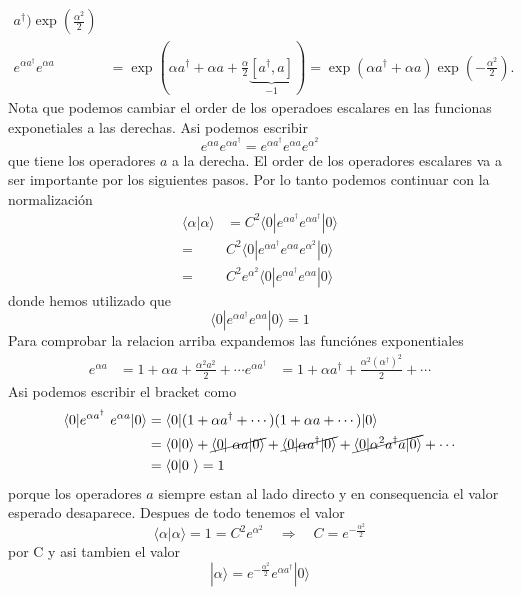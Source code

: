 \begin{solucion}
\begin{align*}
a^\dagger) \exp(\frac{\alpha^2}{2}) \\
	e^{\alpha a^\dagger} e^{\alpha a} &= \exp(\alpha a^\dagger + \alpha a +
\frac{\alpha}{2} \underbrace{[a^\dagger, a]}_{-1}) = \exp(\alpha a^\dagger +
\alpha a) \exp(-\frac{\alpha^2}{2}).
\end{align*}
Nota que podemos cambiar el order de los operadoes escalares en las funcionas
exponetiales a las derechas. Asi podemos escribir
$$
	e^{\alpha a} e^{\alpha a^\dagger} = e^{\alpha a^\dagger} e^{\alpha a}
e^{\alpha^2}
$$
que tiene los operadores $a$ a la derecha. El order de los operadores escalares
va a ser importante por los siguientes pasos. Por lo tanto podemos continuar con
la normalización
\begin{align*}
	\langle \alpha | \alpha \rangle &= C^2 \langle 0 | e^{\alpha a^\dagger}
e^{\alpha a^\dagger} | 0\rangle \\
	=& C^2 \langle 0 | e^{\alpha a^\dagger} e^{\alpha a} e^{\alpha^2} | 0\rangle
\\
	=& C^2 e^{\alpha^2} \langle 0| e^{\alpha a^\dagger} e^{\alpha a} | 0\rangle
\end{align*}
donde hemos utilizado que 
$$
	\langle 0 | e^{\alpha a^\dagger} e^{\alpha a} | 0\rangle = 1
$$
Para comprobar la relacion arriba expandemos las funciónes exponentiales
\begin{align*}
	e^{\alpha a} &= 1 + \alpha a + \frac{\alpha^2 a^2}{2} + \cdots 
	e^{\alpha a^\dagger} &= 1 + \alpha a^\dagger + \frac{\alpha^2
(\alpha^\dagger)^2}{2} + \cdots
\end{align*}
Asi podemos escribir el bracket como 
\begin{align*}
	\langle 0 | e^{\alpha a^\dagger} e^{\alpha a} | 0\rangle &= \langle 0 | ( 1 +
\alpha a^\dagger + \cdots)(1 + \alpha a + \cdots ) | 0 \rangle \\
	&= \langle 0 | 0 \rangle + \cancel{\langle 0 | \alpha a | 0 \rangle} +
\cancel{\langle 0 | \alpha a^\dagger | 0 \rangle} + \cancel{\langle 0 | \alpha^2
a^\dagger a | 0\rangle} + \cdots \\
	&= \langle 0 | 0 \rangle = 1 
\end{align*}
porque los operadores $a$ siempre estan al lado directo y en consequencia el
valor esperado desaparece. Despues de todo tenemos el valor
$$
	\langle \alpha | \alpha \rangle = 1 = C^2 e^{\alpha^2} \quad \Rightarrow
\quad C = e^{-\frac{\alpha^2}{2}}
$$
por C y asi tambien el valor
$$
	|\alpha \rangle = e^{-\frac{\alpha^2}{2}} e^{\alpha a^\dagger} | 0 \rangle
$$
\end{solucion}


